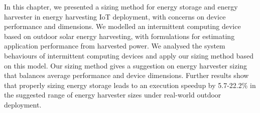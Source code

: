 In this chapter, we presented a sizing method for energy storage and energy harvester in energy harvesting IoT deployment, with concerns on device performance and dimensions. We modelled an intermittent computing device based on outdoor solar energy harvesting, with formulations for estimating application performance from harvested power. We analysed the system behaviours of intermittent computing devices and apply our sizing method based on this model. Our sizing method gives a suggestion on energy harvester sizing that balances average performance and device dimensions. Further results show that properly sizing energy storage leads to an execution speedup by 5.7-22.2\% in the suggested range of energy harvester sizes under real-world outdoor deployment. 